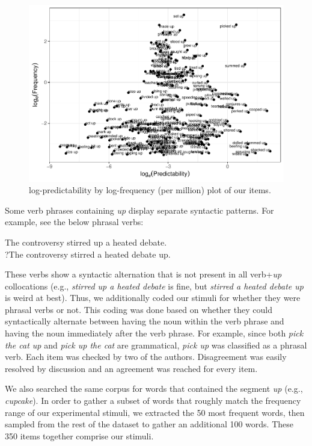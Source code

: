 \documentclass[
  man,floatsintext]{apa6}
\begin{document}
\begin{figure}

{\centering \includegraphics[width=0.8\linewidth]{write-up_files/figure-latex/stimplot2-1} 

}

\caption{log-predictability by log-frequency (per million) plot of our items.}\label{fig:stimplot2}
\end{figure}

Some verb phrases containing \emph{up} display separate syntactic patterns. For example, see the below phrasal verbs:

\begin{exe} 
\ex
  \begin{xlist}
    \ex The controversy stirred up a heated debate. \\
    \ex ?The controversy stirred a heated debate up. \\
  \end{xlist}
\end{exe}

These verbs show a syntactic alternation that is not present in all verb+\emph{up} collocations (e.g., \emph{stirred up a heated debate} is fine, but \emph{stirred a heated debate up} is weird at best). Thus, we additionally coded our stimuli for whether they were phrasal verbs or not. This coding was done based on whether they could syntactically alternate between having the noun within the verb phrase and having the noun immediately after the verb phrase. For example, since both \emph{pick the cat up} and \emph{pick up the cat} are grammatical, \emph{pick up} was classified as a phrasal verb. Each item was checked by two of the authors. Disagreement was easily resolved by discussion and an agreement was reached for every item.

We also searched the same corpus for words that contained the segment \emph{up} (e.g., \emph{cupcake}). In order to gather a subset of words that roughly match the frequency range of our experimental stimuli, we extracted the 50 most frequent words, then sampled from the rest of the dataset to gather an additional 100 words. These 350 items together comprise our stimuli.
\end{document}
